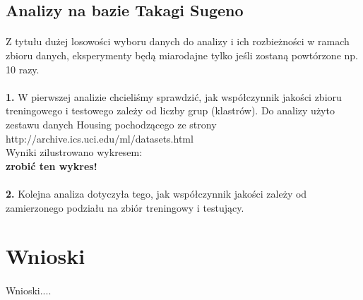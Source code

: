 \documentclass[10pt,a4paper]{article}
\begin{document}
\subsection{Analizy na bazie Takagi Sugeno}
\paragraph{}
Z tytułu dużej losowości wyboru danych do analizy i ich rozbieżności w ramach zbioru danych, eksperymenty będą miarodajne tylko jeśli zostaną powtórzone np. 10 razy.

\paragraph{}
\textbf{1.} W pierwszej analizie chcieliśmy sprawdzić, jak współczynnik jakości zbioru treningowego i testowego zależy od liczby grup (klastrów). Do analizy użyto zestawu danych Housing pochodzącego ze strony\\
http://archive.ics.uci.edu/ml/datasets.html \\
Wyniki zilustrowano wykresem:\\
\textbf{zrobić ten wykres!}
\paragraph{}
\textbf{2.} Kolejna analiza dotyczyła tego, jak współczynnik jakości zależy od zamierzonego podziału na zbiór treningowy i testujący.

\section{Wnioski}
\paragraph{}
Wnioski....
\end{document}
